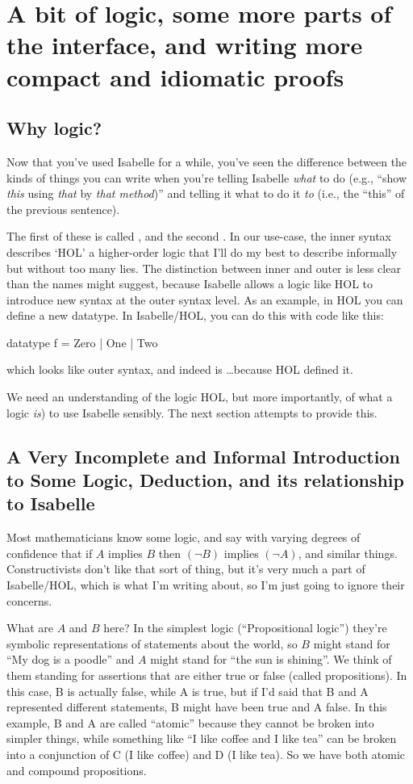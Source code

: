\chapter{A bit  of logic, some more parts of the interface, and writing more compact and idiomatic proofs}

\section{Why logic?}
Now that you've used Isabelle for a while, you've seen the difference between the kinds of things you can write when you're telling Isabelle \textit{what} to do (e.g., ``show \textit{this} using \textit{that} by \textit{that method})'' and telling it what to do it \textit{to} (i.e., the ``this'' of the previous sentence).  

The first of these is called , and the second . In our use-case, the inner syntax describes `HOL' a higher-order logic that I'll do my best to describe informally but without too many lies. The distinction between inner and outer is less clear than the names might suggest, because Isabelle allows a logic like HOL to introduce new syntax at the outer syntax level. As an example, in HOL you can define a new datatype. In Isabelle/HOL, you can do this with code like this:
\begin{IS}
datatype f = Zero | One | Two
\end{IS}
which looks like outer syntax, and indeed is \ldots because HOL defined it. 

We need an understanding of the logic HOL, but more importantly, of what a logic \textit{is}) to use Isabelle sensibly. The next section attempts to provide this. 
\section{
A Very Incomplete and Informal Introduction to Some Logic, Deduction, and its relationship to Isabelle}

Most mathematicians know some logic, and say with varying degrees of confidence that if $A$ implies $B$ then $(\neg B)$ implies $(\neg A)$, and similar things. Constructivists don't like that sort of thing, but it's very much a part of Isabelle/HOL, which is what I'm writing about, so I'm just going to ignore their concerns. 

What are $A$ and $B$ here? In the simplest logic (``Propositional logic'') they're symbolic representations of statements about the world, so $B$ might stand for ``My dog is a poodle'' and $A$ might stand for ``the sun is shining''. We think of them standing for assertions that are either true or false (called propositions). In this case, B is actually false, while A is true, but if I'd said that B and A represented different statements, B might have been true and A false. In this example, B and A are called ``atomic'' because they cannot be broken into simpler things, while something like ``I like coffee and I like tea'' can be broken into a conjunction of C (I like coffee) and D (I like tea). So we have both atomic and compound propositions. 

